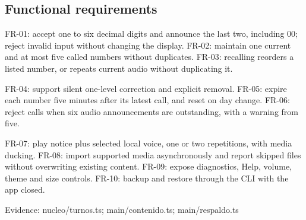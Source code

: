 \subsection{Functional requirements}

FR-01: accept one to six decimal digits and announce the last two, including 00; reject invalid input without changing the display. FR-02: maintain one current and at most five called numbers without duplicates. FR-03: recalling reorders a listed number, or repeats current audio without duplicating it.

FR-04: support silent one-level correction and explicit removal. FR-05: expire each number five minutes after its latest call, and reset on day change. FR-06: reject calls when six audio announcements are outstanding, with a warning from five.

FR-07: play notice plus selected local voice, one or two repetitions, with media ducking. FR-08: import supported media asynchronously and report skipped files without overwriting existing content. FR-09: expose diagnostics, Help, volume, theme and size controls. FR-10: backup and restore through the CLI with the app closed.

Evidence: nucleo/turnos.ts; main/contenido.ts; main/respaldo.ts

